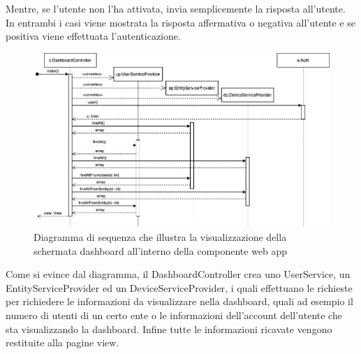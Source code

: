 \begin{landscape}
		\newline
		Mentre, se l'utente non l'ha attivata, invia semplicemente la risposta all'utente. In entrambi i casi viene mostrata la risposta affermativa o negativa all'utente e se positiva viene effettuata l'autenticazione.
		\begin{figure}[H]
			\centering
			\includegraphics[scale=0.600]{res/images/WEBAPP/Dashboard.index.png}
			\caption{Diagramma di sequenza che illustra la visualizzazione della schermata dashboard all'interno della componente web app}
			\label{Diagramma 24}
		\end{figure}
		Come si evince dal diagramma, il DashboardController crea uno UserService, un EntityServiceProvider ed un DeviceServiceProvider, i quali effettuano le richieste  per richiedere le informazioni da visualizzare nella dashboard, quali ad esempio il numero di utenti di un certo ente o le informazioni dell'account dell'utente che sta visualizzando la dashboard. Infine tutte le informazioni ricavate vengono restituite alla pagine view.
	\end{landscape}